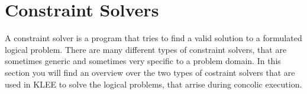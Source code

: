 \section{Constraint Solvers}
A constraint solver is a program that tries to find a valid solution to a formulated logical problem. 
There are many different types of constraint solvers, that are sometimes generic and sometimes very specific to a problem domain.
In this section you will find an overview over the two types of costraint solvers that are used in KLEE to solve the logical problems, that arrise during concolic execution.

